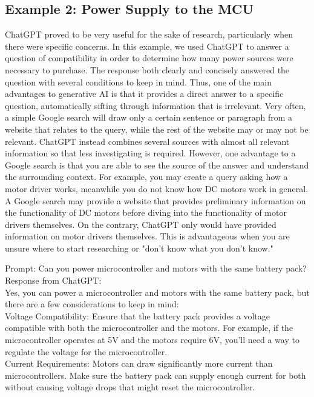 \subsection{Example 2: Power Supply to the MCU}
\noindent ChatGPT proved to be very useful for the sake of research, particularly when there were specific concerns. In this example, we used ChatGPT to answer a question of compatibility in order to determine how many power sources were necessary to purchase. The response both clearly and concisely answered the question with several conditions to keep in mind. Thus, one of the main advantages to generative AI is that it provides a direct answer to a specific question, automatically sifting through information that is irrelevant. Very often, a simple Google search will draw only a certain sentence or paragraph from a website that relates to the query, while the rest of the website may or may not be relevant. ChatGPT instead combines several sources with almost all relevant information so that less investigating is required. However, one advantage to a Google search is that you are able to see the source of the answer and understand the surrounding context. For example, you may create a query asking how a motor driver works, meanwhile you do not know how DC motors work in general. A Google search may provide a website that provides preliminary information on the functionality of DC motors before diving into the functionality of motor drivers themselves. On the contrary, ChatGPT only would have provided information on motor drivers themselves. This is advantageous when you are unsure where to start researching or "don't know what you don't know."

\noindent Prompt: Can you power microcontroller and motors with the same battery pack?\\

\noindent Response from ChatGPT:\\

\noindent Yes, you can power a microcontroller and motors with the same battery pack, but there are a few considerations to keep in mind:\\

\noindent Voltage Compatibility: Ensure that the battery pack provides a voltage compatible with both the microcontroller and the motors. For example, if the microcontroller operates at 5V and the motors require 6V, you'll need a way to regulate the voltage for the microcontroller.\\

\noindent Current Requirements: Motors can draw significantly more current than microcontrollers. Make sure the battery pack can supply enough current for both without causing voltage drops that might reset the microcontroller.\\

